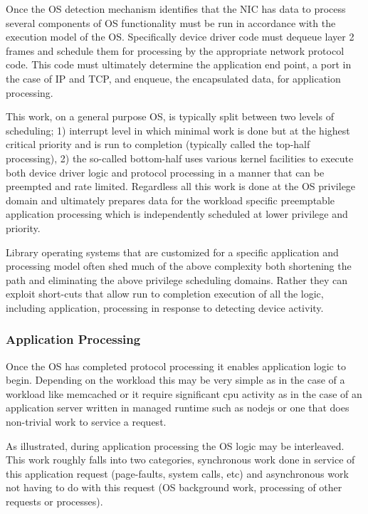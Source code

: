 Once the OS detection mechanism identifies that the NIC has data to process several components of OS functionality must be run in accordance with the execution model of the OS.  Specifically device driver code must dequeue layer 2 frames and schedule them for processing by the appropriate network protocol code. This code must ultimately determine the application end point, a port in the case of IP and TCP, and enqueue, the encapsulated data,  for application processing. 

This work, on a general purpose OS, is typically split between two levels of scheduling; 1) interrupt level in which minimal work is done but at the highest critical priority and is run to completion (typically called the top-half processing), 2) the so-called bottom-half uses various kernel facilities to execute both device driver logic and protocol processing in a manner that can be preempted and rate limited.  Regardless all this work is done at the OS privilege domain and ultimately prepares data for the workload specific preemptable    application processing which is independently scheduled at lower privilege and priority. 

Library operating systems that are customized for a specific application and processing model often shed much of the above complexity both shortening the path and eliminating the above privilege scheduling domains\cite{10.1145/2997641,10.1145/2812806,EbbRT}.  Rather they can exploit short-cuts that allow run to completion execution of all the logic, including application, processing in response to detecting device activity.  

\subsubsection{Application Processing}
\label{sec:workflow:appproc}

Once the OS has completed protocol processing it enables application logic to begin.  Depending on the workload this may be very simple as in the case of a workload like memcached or it require significant cpu activity as in the case of  an application server written in managed runtime such as nodejs or one that does non-trivial work to service a request. 

As illustrated, during application processing the OS logic may be interleaved.  This work roughly falls into two categories, synchronous work done in service of this application request (page-faults, system calls, etc) and asynchronous work not having to do with this request (OS background work, processing of other requests or processes).

